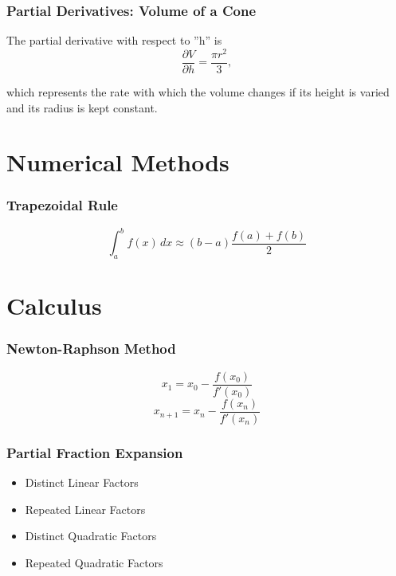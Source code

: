 \documentclass{beamer}
\begin{document}
\begin{frame}
	\frametitle{Partial Derivatives: Volume of a Cone}
	\Large
The partial derivative with respect to ''h'' is
\[\frac{ \partial V}{\partial h} = \frac{\pi r^2}{3},\]

which represents the rate with which the volume changes if its height is varied and its radius is kept constant.
\end{frame}


\section*{Numerical Methods}

\begin{frame}
	\frametitle{Trapezoidal Rule}
\[\int_{a}^{b} f(x)\, dx \approx (b-a)\frac{f(a) + f(b)}{2}\]

\end{frame}
\section{Calculus}
\begin{frame}
\frametitle{Newton-Raphson Method}
\Large
\[x_{1} = x_0 - \frac{f(x_0)}{f'(x_0)}\]
\[x_{n+1} = x_n - \frac{f(x_n)}{f'(x_n)} \]
\end{frame}

\begin{frame}
\frametitle{Partial Fraction Expansion}
\begin{itemize}
	\item Distinct Linear Factors
	\item Repeated Linear Factors
	\item Distinct Quadratic Factors
	\item Repeated Quadratic Factors
\end{itemize}
\end{frame}

\begin{frame}
	\frametitle{{Partial Differentiation}
\[\frac{\partial f}{\partial x}\]

\[z = f(x, y) = \,\! x^2 + xy + y^2.\]
\[\frac{\partial z}{\partial x} = 2x+y\]
\[\frac{\partial z}{\partial x} = 3\]
\end{frame}
\end{document}
